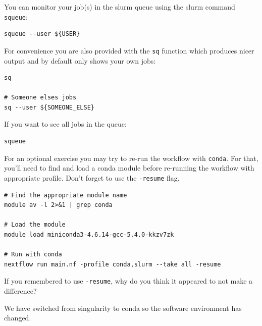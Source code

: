 \begin{note}
You can monitor your job(s) in the slurm queue using the slurm command \texttt{squeue}:

\begin{lstlisting}
squeue --user ${USER}
\end{lstlisting}

For convenience you are also provided with the \texttt{sq} function which produces nicer output and by default only shows your own jobs:

\begin{lstlisting}
sq

# Someone elses jobs
sq --user ${SOMEONE_ELSE}
\end{lstlisting}

If you want to see all jobs in the queue:

\begin{lstlisting}
squeue
\end{lstlisting}

\end{note}

\begin{bonus}
For an optional exercise you may try to re-run the workflow with \texttt{conda}.
For that, you'll need to find and load a conda module before re-running the workflow with appropriate profile. Don't forget to use the \texttt{-resume} flag.
\begin{answer}
\begin{lstlisting}
# Find the appropriate module name
module av -l 2>&1 | grep conda

# Load the module
module load miniconda3-4.6.14-gcc-5.4.0-kkzv7zk

# Run with conda
nextflow run main.nf -profile conda,slurm --take all -resume

\end{lstlisting}
\end{answer}

If you remembered to use \texttt{-resume}, why do you think it appeared to not make a difference?

\begin{answer}
We have switched from singularity to conda so the software environment has changed.  
\end{answer}


\end{bonus}


